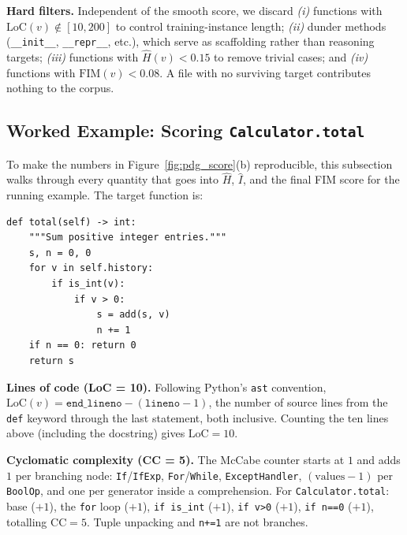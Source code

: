 \textbf{Hard filters.}
Independent of the smooth score, we discard \emph{(i)} functions with
$\mathrm{LoC}(v) \notin [10, 200]$ to control training-instance length;
\emph{(ii)} dunder methods (\texttt{\_\_init\_\_},
\texttt{\_\_repr\_\_}, etc.), which serve as scaffolding rather than
reasoning targets; \emph{(iii)} functions with $\hat{H}(v) < 0.15$ to
remove trivial cases; and \emph{(iv)} functions with
$\mathrm{FIM}(v) < 0.08$. A file with no surviving target contributes
nothing to the corpus.

\subsection{Worked Example: Scoring \texttt{Calculator.total}}
\label{app:algo:worked_example}

To make the numbers in Figure~\ref{fig:pdg_score}(b) reproducible, this
subsection walks through every quantity that goes into $\hat{H}$,
$\hat{I}$, and the final FIM score for the running example. The target
function is:

\begin{center}\small
\begin{minipage}{0.78\linewidth}
\begin{verbatim}
def total(self) -> int:
    """Sum positive integer entries."""
    s, n = 0, 0
    for v in self.history:
        if is_int(v):
            if v > 0:
                s = add(s, v)
                n += 1
    if n == 0: return 0
    return s
\end{verbatim}
\end{minipage}
\end{center}

\textbf{Lines of code (LoC = 10).}
Following Python's \texttt{ast} convention,
$\mathrm{LoC}(v)=\texttt{end\_lineno}-(\texttt{lineno}-1)$, the number
of source lines from the \texttt{def} keyword through the last
statement, both inclusive. Counting the ten lines above (including the
docstring) gives $\mathrm{LoC}=10$.

\textbf{Cyclomatic complexity (CC = 5).}
The McCabe counter starts at $1$ and adds $1$ per branching node:
\texttt{If}/\texttt{IfExp}, \texttt{For}/\texttt{While},
\texttt{ExceptHandler}, $(\text{values}{-}1)$ per \texttt{BoolOp}, and
one per generator inside a comprehension. For
\texttt{Calculator.total}: base ($+1$), the \texttt{for} loop ($+1$),
\texttt{if is\_int} ($+1$), \texttt{if v>0} ($+1$), \texttt{if n==0}
($+1$), totalling $\mathrm{CC}=5$. Tuple unpacking and \texttt{n+=1}
are not branches.

